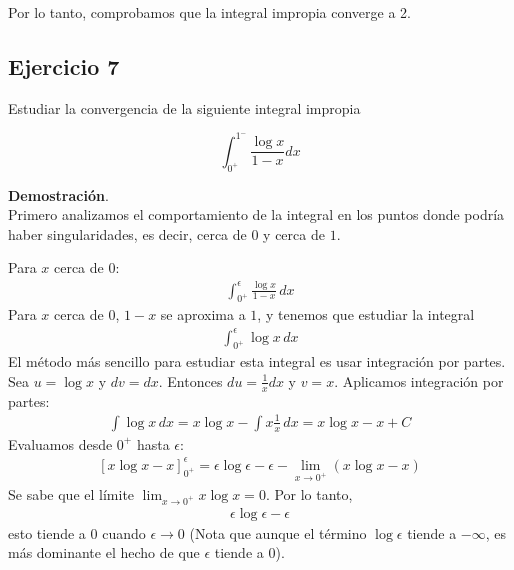 \documentclass{article}
\begin{document}
    Por lo tanto, comprobamos que la integral impropia converge a 2.

    \subsection*{Ejercicio 7}

    Estudiar la convergencia de la siguiente integral impropia

    $$
    \int_{0^{+}}^{1^{-}} \frac{\log x}{1-x} d x
    $$

    \textbf{Demostración}.\\

    Primero analizamos el comportamiento de la integral en los puntos donde podría haber singularidades, es decir, cerca de $0$ y cerca de $1$.

    Para $x$ cerca de $0$:
    \begin{align*}
    \int_{0^+}^\epsilon \frac{\log x}{1-x} \, dx
    \end{align*}
    Para $x$ cerca de $0$, $1-x$ se aproxima a $1$, y tenemos que estudiar la integral
    \begin{align*}
    \int_{0^+}^\epsilon \log x \, dx
    \end{align*}
    El método más sencillo para estudiar esta integral es usar integración por partes. Sea $u = \log x$ y $dv = dx$. Entonces $du = \frac{1}{x} dx$ y $v = x$. Aplicamos integración por partes:
    \begin{align*}
    \int \log x \, dx = x \log x - \int x \frac{1}{x} \, dx = x \log x - x + C
    \end{align*}
    Evaluamos desde $0^+$ hasta $\epsilon$:
    \begin{align*}
    \left[ x \log x - x \right]_{0^+}^\epsilon = \epsilon \log \epsilon - \epsilon - \lim_{x \to 0^+}(x \log x - x)
    \end{align*}
    Se sabe que el límite $\lim_{x \to 0^+} x \log x = 0$. Por lo tanto,
    \begin{align*}
    \epsilon \log \epsilon - \epsilon
    \end{align*}
    esto tiende a $0$ cuando $\epsilon \to 0$ (Nota que aunque el término $ \log \epsilon$ tiende a $-\infty$, es más dominante el hecho de que $\epsilon$ tiende a $0$).
\end{document}
